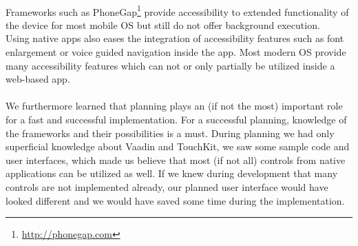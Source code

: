\\
Frameworks such as PhoneGap\footnote{\url{http://phonegap.com}} provide accessibility to extended functionality of the device for most mobile OS but still do not offer background execution.
\\
Using native apps also eases the integration of accessibility features such as font enlargement or voice guided navigation inside the app. Most modern OS provide many accessibility features which can not or only partially be utilized inside a web-based app.
\\
\\
We furthermore learned that planning plays an (if not the most) important role for a fast and successful implementation. For a successful planning, knowledge of the frameworks and their possibilities is a must. During planning we had only superficial knowledge about Vaadin and TouchKit, we saw some sample code and user interfaces, which made us believe that most (if not all) controls from native applications can be utilized as well. If we knew during development that many controls are not implemented already, our planned user interface would have looked different and we would have saved some time during the implementation.